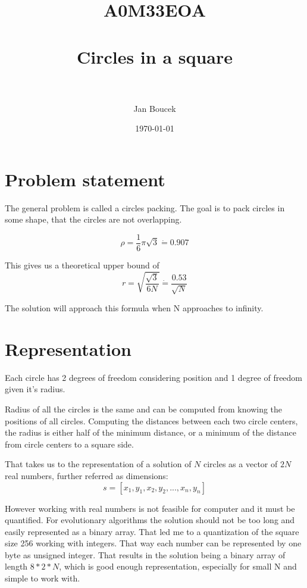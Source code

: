 \documentclass[paper=a4, fontsize=11pt]{scrartcl} %
\title{	
\normalfont \normalsize 
\textsc{A0M33EOA} \\ [25pt] %
\horrule{0.5pt} \\[0.4cm] %
\huge Circles in a square \\ %
\horrule{2pt} \\[0.5cm] %
}
\author{Jan Boucek} %
\date{\normalsize\today} %
\numberwithin{equation}{section} %
\numberwithin{figure}{section} %
\numberwithin{table}{section} %
\begin{document}
\maketitle %


\section{Problem statement}
The general problem is called a circles packing. The goal is to pack circles in some shape, that the circles are not overlapping. 


\begin{equation}
\rho = \frac{1}{6}\pi\sqrt{3} \dot{=} 0.907 
\end{equation}

This gives us a theoretical upper bound of
\begin{equation}
r = \sqrt{\frac{\sqrt{3}}{6N}} \dot{=} \frac{0.53}{\sqrt{N}}
\end{equation}

The solution will approach this formula when N approaches to infinity.

\newpage
\section{Representation}
Each circle has 2 degrees of freedom considering position and 1 degree of freedom given it's radius. 

Radius of all the circles is the same and can be computed from knowing the positions of all circles. Computing the distances between each two circle centers, the radius is either half of the minimum distance, or a minimum of the distance from circle centers to a square side. 

That takes us to the representation of a solution of $N$ circles as a vector of $2N$ real numbers, further referred as dimensions:
\begin{equation}
s = [x_1, y_1, x_2, y_2, ..., x_n, y_n]
\end{equation}

However working with real numbers is not feasible for computer and it must be quantified. For evolutionary algorithms the solution should not be too long and easily represented as a binary array. That led me to a quantization of the square size 256 working with integers. That way each number can be represented by one byte as unsigned integer. That results in the solution being a binary array of length $8*2*N$, which is good enough representation, especially for small N and simple to work with.
\end{document}
